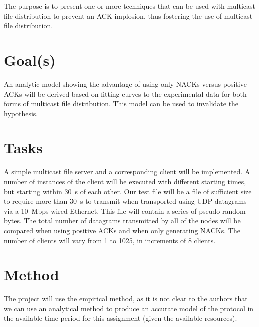 \documentclass[12pt,twoside,english]{article}
\begin{document}
The purpose is to present one or more techniques that can be used with multicast file distribution to prevent an \gls{ACK} implosion, thus fostering the use of multicast file distribution.

\section{Goal(s)}
\label{sect:goals}

An analytic model showing the advantage of using only \glspl{NACK} versus positive \glspl{ACK} will be derived based on fitting curves to the experimental data for both forms of multicast file distribution. This model can be used to invalidate the hypothesis.

\section{Tasks}
\label{sect:tasks}

A simple multicast file server and a corresponding client will be implemented. A number of instances of the client will be executed with different starting times, but starting within \SI{30}{\second} of each other. Our test file will be a file of sufficient size to require more than \SI{30}{\second} to transmit when transported using \gls{UDP} datagrams via a \SI{10}{Mbps} wired Ethernet. This file will contain a series of pseudo-random bytes. The total number of datagrams transmitted by all of the nodes will be compared when using positive \glspl{ACK} and when only generating \glspl{NACK}. The number of clients will vary from 1 to 1025, in increments of 8 clients.

\section{Method}
\label{sect:method}

The project will use the empirical method\cite{peter_bock_getting_2001}, as it is not clear to the authors that we can use an analytical method to produce an accurate model of the protocol in the available time period for this assignment (given the available resources).
\end{document}
